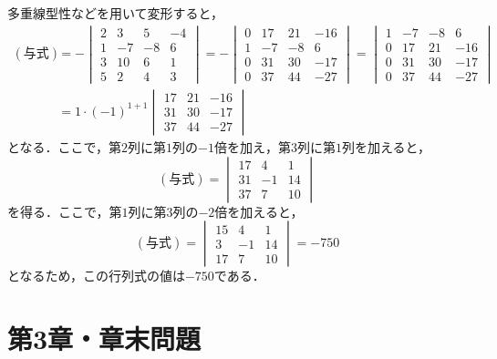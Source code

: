 \documentclass[a4paper,10pt,fleqn]{ltjsarticle}
\begin{document}
\begin{tleftbar}
  多重線型性などを用いて変形すると，
  \begin{align*}
    (\text{与式}) & = -
    \begin{vmatrix}
      2 & 3  & 5  & -4 \\
      1 & -7 & -8 & 6  \\
      3 & 10 & 6  & 1  \\
      5 & 2  & 4  & 3
    \end{vmatrix}
    = -
    \begin{vmatrix}
      0 & 17 & 21 & -16 \\
      1 & -7 & -8 & 6   \\
      0 & 31 & 30 & -17 \\
      0 & 37 & 44 & -27
    \end{vmatrix}
    =
    \begin{vmatrix}
      1 & -7 & -8 & 6   \\
      0 & 17 & 21 & -16 \\
      0 & 31 & 30 & -17 \\
      0 & 37 & 44 & -27
    \end{vmatrix}
    \\
                & = 1 \cdot (-1)^{1+1}
    \begin{vmatrix}
      17 & 21 & -16 \\
      31 & 30 & -17 \\
      37 & 44 & -27
    \end{vmatrix}
  \end{align*}
  となる．ここで，第$2$列に第$1$列の$-1$倍を加え，第$3$列に第$1$列を加えると，
  \[
    (\text{与式}) =
    \begin{vmatrix}
      17 & 4  & 1  \\
      31 & -1 & 14 \\
      37 & 7  & 10
    \end{vmatrix}
  \]
  を得る．ここで，第$1$列に第$3$列の$-2$倍を加えると，
  \[
    (\text{与式})=
    \begin{vmatrix}
      15 & 4  & 1  \\
      3  & -1 & 14 \\
      17 & 7  & 10
    \end{vmatrix}
    = -750
  \]
  となるため，この行列式の値は$-750$である．
\end{tleftbar}

\newpage
\part*{第3章・章末問題}
\end{document}
